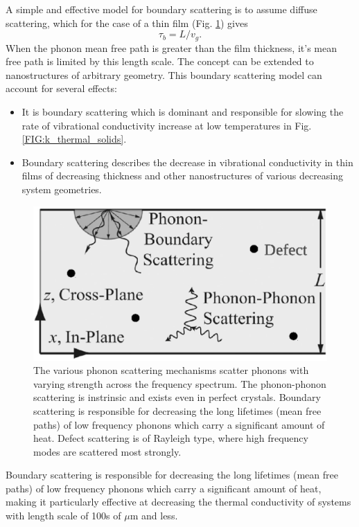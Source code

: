 \documentclass[letterpaper,12pt]{article}
\begin{document}
A simple and effective model for boundary scattering is to assume diffuse scattering, which for the case of a thin film (Fig. \ref{FIG:phonon_scattering_diag}) gives
\begin{equation}\label{EQ:M:tau_b}
\tau_{b} = L/v_g.
\end{equation}
When the phonon mean free path is greater than the film thickness, it's mean free path is limited by this length scale.  The concept can be extended to nanostructures of arbitrary geometry.\cite{mcgaughey:061911} This boundary scattering model can account for several effects:

\begin{itemize}

\item It is boundary scattering which is dominant and responsible for slowing the rate of vibrational conductivity increase at low temperatures in Fig$.$ \ref{FIG:k_thermal_solids}.

\item Boundary scattering describes the decrease in vibrational conductivity in thin films of decreasing thickness and other nanostructures of various decreasing system geometries.\cite{mcgaughey:061911}
\end{itemize}
\begin{figure}
\begin{center}
\includegraphics[scale=0.25]{phonon_scattering_diagram.eps}
\vspace*{-5mm}
\end{center}
\caption{\label{FIG:phonon_scattering_diag} The various phonon scattering mechanisms scatter phonons with varying strength across the frequency spectrum. The phonon-phonon scattering is instrinsic and exists even in perfect crystals. Boundary scattering is responsible for decreasing the long lifetimes (mean free paths) of low frequency phonons which carry a significant amount of heat. Defect scattering is of Rayleigh type, where high frequency modes are scattered most strongly.}
\end{figure}
Boundary scattering is responsible for decreasing the long lifetimes (mean free paths) of low frequency phonons which carry a significant amount of heat, making it particularly effective at decreasing the thermal conductivity of systems with length scale of 100s of $\mu$m  and less.\cite{mcgaughey:061911}
\end{document}
